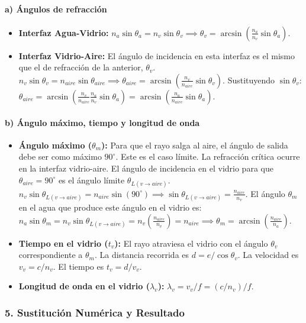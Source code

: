 \paragraph*{a) Ángulos de refracción}
\begin{itemize}
    \item \textbf{Interfaz Agua-Vidrio:} $n_a \sin\theta_a = n_v \sin\theta_v \implies \theta_v = \arcsin\left(\frac{n_a}{n_v}\sin\theta_a\right)$.
    \item \textbf{Interfaz Vidrio-Aire:} El ángulo de incidencia en esta interfaz es el mismo que el de refracción de la anterior, $\theta_v$.
    $n_v \sin\theta_v = n_{aire} \sin\theta_{aire} \implies \theta_{aire} = \arcsin\left(\frac{n_v}{n_{aire}}\sin\theta_v\right)$.
    Sustituyendo $\sin\theta_v$: $\theta_{aire} = \arcsin\left(\frac{n_v}{n_{aire}}\frac{n_a}{n_v}\sin\theta_a\right) = \arcsin\left(\frac{n_a}{n_{aire}}\sin\theta_a\right)$.
\end{itemize}
\paragraph*{b) Ángulo máximo, tiempo y longitud de onda}
\begin{itemize}
    \item \textbf{Ángulo máximo ($\theta_m$):} Para que el rayo salga al aire, el ángulo de salida debe ser como máximo $90^\circ$. Este es el caso límite. La refracción crítica ocurre en la interfaz vidrio-aire. El ángulo de incidencia en el vidrio para que $\theta_{aire}=90^\circ$ es el ángulo límite $\theta_{L(v \to aire)}$.
    $n_v \sin\theta_{L(v \to aire)} = n_{aire} \sin(90^\circ) \implies \sin\theta_{L(v \to aire)} = \frac{n_{aire}}{n_v}$.
    El ángulo $\theta_m$ en el agua que produce este ángulo en el vidrio es:
    $n_a \sin\theta_m = n_v \sin\theta_{L(v \to aire)} = n_v \left(\frac{n_{aire}}{n_v}\right) = n_{aire} \implies \theta_m = \arcsin\left(\frac{n_{aire}}{n_a}\right)$.
    \item \textbf{Tiempo en el vidrio ($t_v$):} El rayo atraviesa el vidrio con el ángulo $\theta_v$ correspondiente a $\theta_m$. La distancia recorrida es $d = e / \cos\theta_v$. La velocidad es $v_v = c/n_v$. El tiempo es $t_v = d/v_v$.
    \item \textbf{Longitud de onda en el vidrio ($\lambda_v$):} $\lambda_v = v_v/f = (c/n_v)/f$.
\end{itemize}

\subsubsection*{5. Sustitución Numérica y Resultado}
